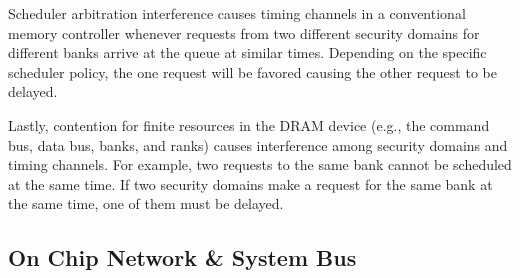 Scheduler arbitration interference causes timing channels in a conventional 
memory controller whenever requests from two different security domains for 
different banks arrive at the queue at similar times. Depending on the specific 
scheduler policy, the one request will be favored causing the other request to 
be delayed.

Lastly, contention for finite resources in the DRAM device (e.g., the command 
bus, data bus, banks, and ranks) causes interference among security domains and 
timing channels. For example, two requests to the same bank cannot be scheduled 
at the same time. If two security domains make a request for the same bank at 
the same time, one of them must be delayed.

\subsection{On Chip Network \& System Bus}
